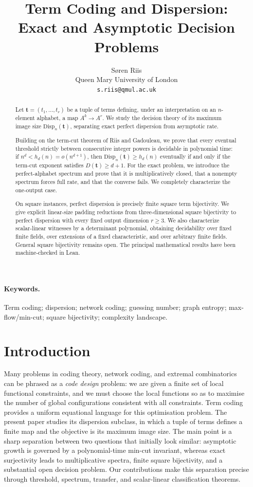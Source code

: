 \documentclass[11pt]{article}
\title{\textbf{Term Coding and Dispersion:}\\
\textbf{Exact and Asymptotic Decision Problems}}
\author{S\o ren Riis\\
Queen Mary University of London\\
\texttt{s.riis@qmul.ac.uk}}
\date{}
\theoremstyle{definition}
\theoremstyle{plain}
\newcommand{\Disp}{\mathrm{Disp}}
\begin{document}
\maketitle

\begin{abstract}
Let $\mathbf t=(t_1,\ldots,t_r)$ be a tuple of terms defining, under an interpretation on an
$n$-element alphabet, a map $A^k\to A^r$.  We study the decision theory of its maximum image size
$\Disp_n(\mathbf t)$, separating exact perfect dispersion from asymptotic rate.

Building on the term-cut theorem of Riis and Gadouleau, we prove that every eventual threshold strictly
between consecutive integer powers is decidable in polynomial time: if
$n^d<h_d(n)=o(n^{d+1})$, then $\Disp_n(\mathbf t)\ge h_d(n)$ eventually if and only if the term-cut
exponent satisfies $D(\mathbf t)\ge d+1$.  For the exact problem, we introduce the perfect-alphabet spectrum
and prove that it is multiplicatively closed, that a nonempty spectrum forces full rate, and that the converse
fails.  We completely characterize the one-output case.

On square instances, perfect dispersion is precisely finite square term bijectivity.  We give explicit
linear-size padding reductions from three-dimensional square bijectivity to perfect dispersion with every fixed
output dimension $r\ge3$.  We also characterize scalar-linear witnesses by a determinant polynomial, obtaining
decidability over fixed finite fields, over extensions of a fixed characteristic, and over arbitrary finite
fields.  General square bijectivity remains open.  The principal mathematical results have been machine-checked
in Lean.
\end{abstract}

\paragraph{Keywords.}
Term coding; dispersion; network coding; guessing number; graph entropy; max-flow/min-cut; square bijectivity; complexity landscape.


\section{Introduction}
\label{sec:intro}
Many problems in coding theory, network coding, and extremal combinatorics can be phrased as a
\emph{code design} problem:
we are given a finite set of local functional constraints, and we must choose the local functions
so as to maximise the number of global configurations consistent with all constraints.
Term coding provides a uniform equational language for this optimisation problem.  The present paper studies
its dispersion subclass, in which a tuple of terms defines a finite map and the objective is its maximum image
size.  The main point is a sharp separation between two questions that initially look similar: asymptotic growth
is governed by a polynomial-time min-cut invariant, whereas exact surjectivity leads to multiplicative spectra,
finite square bijectivity, and a substantial open decision problem.  Our contributions make this separation
precise through threshold, spectrum, transfer, and scalar-linear classification theorems.
\end{document}
